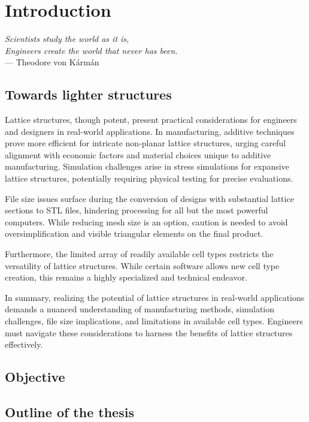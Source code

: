 \chapter*{Introduction}

\textit{Scientists study the world as it is,}\\
\textit{Engineers create the world that never has been.} \vspace{5pt} \\
--- Theodore von K\'arm\'an \\

\section*{Towards lighter structures}



Lattice structures, though potent, present practical considerations for engineers and designers in real-world applications. In manufacturing, additive techniques prove more efficient for intricate non-planar lattice structures, urging careful alignment with economic factors and material choices unique to additive manufacturing. Simulation challenges arise in stress simulations for expansive lattice structures, potentially requiring physical testing for precise evaluations.

File size issues surface during the conversion of designs with substantial lattice sections to STL files, hindering processing for all but the most powerful computers. While reducing mesh size is an option, caution is needed to avoid oversimplification and visible triangular elements on the final product.

Furthermore, the limited array of readily available cell types restricts the versatility of lattice structures. While certain software allows new cell type creation, this remains a highly specialized and technical endeavor.

In summary, realizing the potential of lattice structures in real-world applications demands a nuanced understanding of manufacturing methods, simulation challenges, file size implications, and limitations in available cell types. Engineers must navigate these considerations to harness the benefits of lattice structures effectively.



\section*{Objective}

\section*{Outline of the thesis}